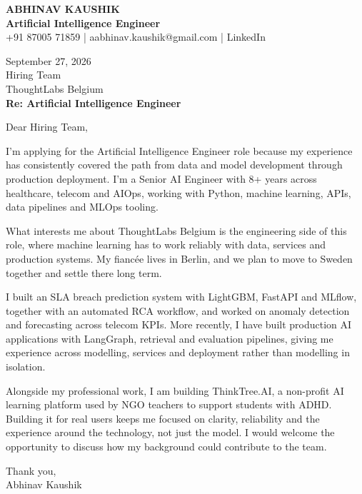 \documentclass[10pt,a4paper]{article}
\begin{document}
\begin{center}
{\Large\bfseries ABHINAV KAUSHIK}\\[2pt]
{\bfseries Artificial Intelligence Engineer}\\[2pt]
+91 87005 71859 \quad | \quad aabhinav.kaushik@gmail.com \quad | \quad LinkedIn
\end{center}
\vspace{8pt}
September 27, 2026\\[6pt]
Hiring Team\\
ThoughtLabs Belgium\\[4pt]
\textbf{Re: Artificial Intelligence Engineer}

Dear Hiring Team,

I’m applying for the Artificial Intelligence Engineer role because my experience has consistently covered the path from data and model development through production deployment. I’m a Senior AI Engineer with 8+ years across healthcare, telecom and AIOps, working with Python, machine learning, APIs, data pipelines and MLOps tooling.

What interests me about ThoughtLabs Belgium is the engineering side of this role, where machine learning has to work reliably with data, services and production systems. My fiancée lives in Berlin, and we plan to move to Sweden together and settle there long term.

I built an SLA breach prediction system with LightGBM, FastAPI and MLflow, together with an automated RCA workflow, and worked on anomaly detection and forecasting across telecom KPIs. More recently, I have built production AI applications with LangGraph, retrieval and evaluation pipelines, giving me experience across modelling, services and deployment rather than modelling in isolation.

Alongside my professional work, I am building ThinkTree.AI, a non-profit AI learning platform used by NGO teachers to support students with ADHD. Building it for real users keeps me focused on clarity, reliability and the experience around the technology, not just the model. I would welcome the opportunity to discuss how my background could contribute to the team.

Thank you,\\
Abhinav Kaushik
\end{document}
